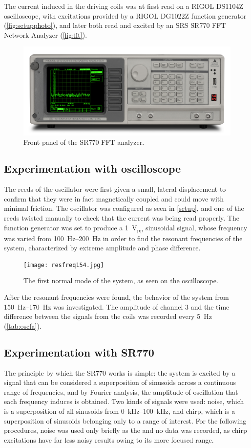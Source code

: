 \documentclass{article}
\begin{document}
The current induced in the driving coils was at first read on a RIGOL DS1104Z oscilloscope, with excitations provided by a RIGOL DG1022Z function generator (\autoref{fig:setupphoto}), and later both read and excited by an SRS SR770 FFT Network Analyzer (\autoref{fig:fft}).

\begin{figure}
  \centering
  \includegraphics[width=\linewidth]{SR770_FPlg.jpg}
  \caption{Front panel of the SR770 FFT analyzer.}
  \label{fig:fft}
\end{figure}

\subsection{Experimentation with oscilloscope}
The reeds of the oscillator were first given a small, lateral displacement to confirm that they were in fact magnetically coupled and could move with minimal friction. The oscillator was configured as seen in \autoref{setup}, and one of the reeds twisted manually to check that the current was being read properly. The function generator was set to produce a \qty{1}{V_{pp}} sinusoidal signal, whose frequency was varied from \qtyrange{100}{200}{Hz} in order to find the resonant frequencies of the system, characterized by extreme amplitude and phase difference.
\begin{figure}
  \centering
  \texttt{[image: resfreq154.jpg]}
  \caption{The first normal mode of the system, as seen on the oscilloscope.}
\end{figure}

After the resonant frequencies were found, the behavior of the system from \qtyrange{150}{170}{Hz} was investigated. The amplitude of channel 3 and the time difference between the signals from the coils was recorded every \qty{5}{Hz} (\autoref{tab:oscfa}).

\subsection{Experimentation with SR770}
The principle by which the SR770 works is simple: the system is excited by a signal that can be considered a superposition of sinusoids across a continuous range of frequencies, and by Fourier analysis, the amplitude of oscillation that each frequency induces is obtained. Two kinds of signals were used: noise, which is a superposition of all sinusoids from \qtyrange{0}{100}{kHz}, and chirp, which is a superposition of sinusoids belonging only to a range of interest. For the following procedures, noise was used only briefly as the and no data was recorded, as chirp excitations have far less noisy results owing to its more focused range.
\end{document}
